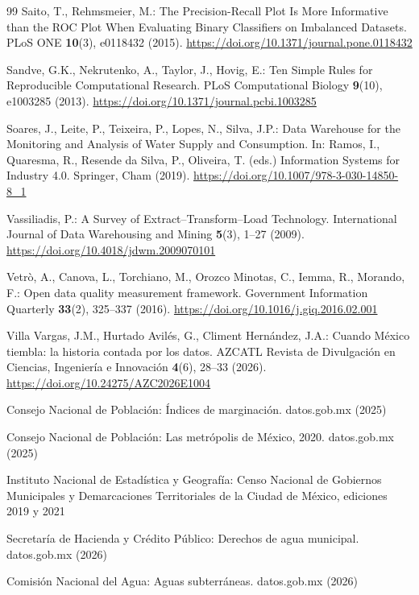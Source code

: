 \documentclass[runningheads]{llncs}
\newif\ifmarcarcambios
\newcommand{\icokg}[1]{\ifmarcarcambios\textcolor{nuevo}{#1}\else#1\fi}
\renewcommand{\_}{\origunderscore\allowbreak}
\begin{document}
\begin{thebibliography}{99}
 Saito, T., Rehmsmeier, M.: The Precision-Recall Plot Is More Informative than the ROC Plot When Evaluating Binary Classifiers on Imbalanced Datasets. PLoS ONE \textbf{10}(3), e0118432 (2015). \url{https://doi.org/10.1371/journal.pone.0118432}

 Sandve, G.K., Nekrutenko, A., Taylor, J., Hovig, E.: Ten Simple Rules for Reproducible Computational Research. PLoS Computational Biology \textbf{9}(10), e1003285 (2013). \url{https://doi.org/10.1371/journal.pcbi.1003285}

 Soares, J., Leite, P., Teixeira, P., Lopes, N., Silva, J.P.: Data Warehouse for the Monitoring and Analysis of Water Supply and Consumption. In: Ramos, I., Quaresma, R., Resende da Silva, P., Oliveira, T. (eds.) Information Systems for Industry 4.0. Springer, Cham (2019). \url{https://doi.org/10.1007/978-3-030-14850-8_1}

 Vassiliadis, P.: A Survey of Extract--Transform--Load Technology. International Journal of Data Warehousing and Mining \textbf{5}(3), 1--27 (2009). \url{https://doi.org/10.4018/jdwm.2009070101}

 Vetr\`o, A., Canova, L., Torchiano, M., Orozco Minotas, C., Iemma, R., Morando, F.: Open data quality measurement framework. Government Information Quarterly \textbf{33}(2), 325--337 (2016). \url{https://doi.org/10.1016/j.giq.2016.02.001}

 \icokg{Villa Vargas, J.M., Hurtado Avil\'es, G., Climent Hern\'andez, J.A.: Cuando M\'exico tiembla: la historia contada por los datos. AZCATL Revista de Divulgaci\'on en Ciencias, Ingenier\'ia e Innovaci\'on \textbf{4}(6), 28--33 (2026). \url{https://doi.org/10.24275/AZC2026E1004}}

 Consejo Nacional de Poblaci\'on: \'Indices de marginaci\'on. datos.gob.mx (2025)

 Consejo Nacional de Poblaci\'on: Las metr\'opolis de M\'exico, 2020. datos.gob.mx (2025)

 Instituto Nacional de Estad\'istica y Geograf\'ia: Censo Nacional de Gobiernos Municipales y Demarcaciones Territoriales de la Ciudad de M\'exico, ediciones 2019 y 2021

 Secretar\'ia de Hacienda y Cr\'edito P\'ublico: Derechos de agua municipal. datos.gob.mx (2026)

 Comisi\'on Nacional del Agua: Aguas subterr\'aneas. datos.gob.mx (2026)


\end{thebibliography}
\end{document}
